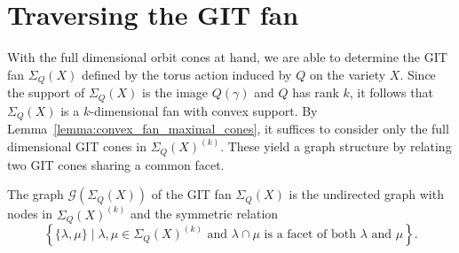 \section{Traversing the GIT fan}

With the full dimensional orbit cones at hand, we are able to determine the GIT fan $\Sigma_Q(X)$ defined by the torus action induced by $Q$ on the variety $X$. Since the support of $\Sigma_Q(X)$ is the image $Q(\gamma)$ and $Q$ has rank $k$, it follows that $\Sigma_Q(X)$ is a $k$-dimensional fan with convex support.
%
By Lemma~\ref{lemma:convex_fan_maximal_cones}, it suffices to consider only the full dimensional GIT cones in $\Sigma_Q(X)^{(k)}$. These yield a graph structure by relating two GIT cones sharing a common facet.

\begin{defi}
	The graph $\mathcal{G}(\Sigma_Q(X))$ of the GIT fan $\Sigma_Q(X)$ is the undirected graph with nodes in $\Sigma_Q(X)^{(k)}$ and the symmetric relation
	$$\left\{\{\lambda, \mu\} \mid \lambda, \mu \in \Sigma_Q(X)^{(k)} \text{ and }\lambda \cap \mu \text{ is a facet of both }\lambda\text{ and }\mu\right\}.$$
\end{defi}


